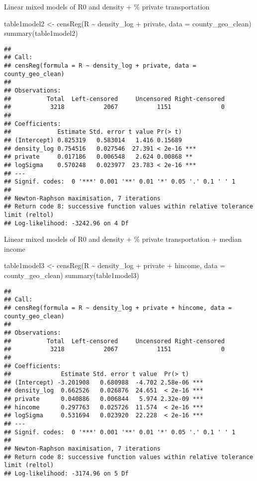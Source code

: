 \documentclass[10pt,letterpaper]{article}
\newenvironment{Shaded}{\begin{snugshade}}{\end{snugshade}}
\newcommand{\AttributeTok}[1]{\textcolor[rgb]{0.77,0.63,0.00}{#1}}
\newcommand{\FunctionTok}[1]{\textcolor[rgb]{0.00,0.00,0.00}{#1}}
\newcommand{\NormalTok}[1]{#1}
\newcommand{\OtherTok}[1]{\textcolor[rgb]{0.56,0.35,0.01}{#1}}
\newcommand{\SpecialCharTok}[1]{\textcolor[rgb]{0.00,0.00,0.00}{#1}}
\begin{document}
Linear mixed models of R0 and density + \% private transportation

\begin{Shaded}
\begin{Highlighting}[]
\NormalTok{table1model2 }\OtherTok{\textless{}{-}} \FunctionTok{censReg}\NormalTok{(R }\SpecialCharTok{\textasciitilde{}}\NormalTok{ density\_log }\SpecialCharTok{+}\NormalTok{ private, }
                    \AttributeTok{data =}\NormalTok{ county\_geo\_clean)}
\FunctionTok{summary}\NormalTok{(table1model2)}
\end{Highlighting}
\end{Shaded}

\begin{verbatim}
## 
## Call:
## censReg(formula = R ~ density_log + private, data = county_geo_clean)
## 
## Observations:
##          Total  Left-censored     Uncensored Right-censored 
##           3218           2067           1151              0 
## 
## Coefficients:
##             Estimate Std. error t value Pr(> t)    
## (Intercept) 0.825319   0.583014   1.416 0.15689    
## density_log 0.754516   0.027546  27.391 < 2e-16 ***
## private     0.017186   0.006548   2.624 0.00868 ** 
## logSigma    0.570248   0.023977  23.783 < 2e-16 ***
## ---
## Signif. codes:  0 '***' 0.001 '**' 0.01 '*' 0.05 '.' 0.1 ' ' 1
## 
## Newton-Raphson maximisation, 7 iterations
## Return code 8: successive function values within relative tolerance limit (reltol)
## Log-likelihood: -3242.96 on 4 Df
\end{verbatim}

Linear mixed models of R0 and density + \% private transportation +
median income

\begin{Shaded}
\begin{Highlighting}[]
\NormalTok{table1model3 }\OtherTok{\textless{}{-}} \FunctionTok{censReg}\NormalTok{(R }\SpecialCharTok{\textasciitilde{}}\NormalTok{ density\_log }\SpecialCharTok{+}\NormalTok{ private }\SpecialCharTok{+}\NormalTok{ hincome, }
                    \AttributeTok{data =}\NormalTok{ county\_geo\_clean)}
\FunctionTok{summary}\NormalTok{(table1model3)}
\end{Highlighting}
\end{Shaded}

\begin{verbatim}
## 
## Call:
## censReg(formula = R ~ density_log + private + hincome, data = county_geo_clean)
## 
## Observations:
##          Total  Left-censored     Uncensored Right-censored 
##           3218           2067           1151              0 
## 
## Coefficients:
##              Estimate Std. error t value  Pr(> t)    
## (Intercept) -3.201908   0.680988  -4.702 2.58e-06 ***
## density_log  0.662526   0.026876  24.651  < 2e-16 ***
## private      0.040886   0.006844   5.974 2.32e-09 ***
## hincome      0.297763   0.025726  11.574  < 2e-16 ***
## logSigma     0.531694   0.023920  22.228  < 2e-16 ***
## ---
## Signif. codes:  0 '***' 0.001 '**' 0.01 '*' 0.05 '.' 0.1 ' ' 1
## 
## Newton-Raphson maximisation, 7 iterations
## Return code 8: successive function values within relative tolerance limit (reltol)
## Log-likelihood: -3174.96 on 5 Df
\end{verbatim}
\end{document}
